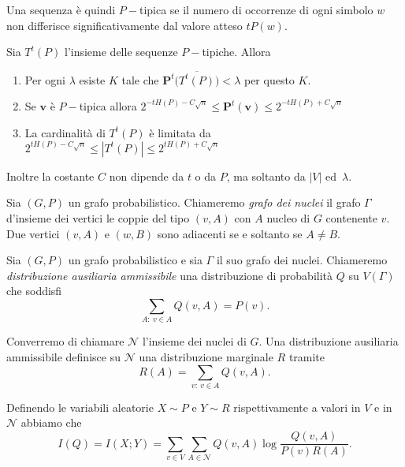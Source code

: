 Una sequenza è quindi \(P-\)tipica se il numero di occorrenze di ogni simbolo \(w\) non differisce significativamente dal valore atteso \(tP(w)\). 
\begin{lemma}
	\label{ptyplemma} Sia \(T^t(P)\) l'insieme delle sequenze \(P-\)tipiche. Allora 
	\begin{enumerate}
		\item Per ogni \(\lambda\) esiste \(K\) tale che \(\mathbf{P}^t\big(\overline{T^{t}(P)}\big)<\lambda\) per questo \(K\). 
		\item Se \(\mathbf{v}\) è \(P-\)tipica allora \(2^{-tH(P)-C\sqrt{n}}\le \mathbf{P}^t(\mathbf{v})\le2^{-tH(P)+C\sqrt{n}}\) 
		\item La cardinalità di \(T^{t}(P)\) è limitata da \(2^{tH(P)-C\sqrt{n}}\le |T^{t}(P)|\le 2^{tH(P)+C\sqrt{n}}\) 
	\end{enumerate}
	Inoltre la costante \(C\) non dipende da \(t\) o da \(P\), ma soltanto da \(|V|\) ed\ \(\lambda\). 
\end{lemma}
\begin{definition}
	Sia \((G,P)\) un grafo probabilistico. Chiameremo \emph{grafo dei nuclei} il grafo \(\Gamma\) d'insieme dei vertici le coppie del tipo \((v,A)\) con \(A\) nucleo di \(G\) contenente \(v\). Due vertici \((v,A)\) e \((w,B)\) sono adiacenti se e soltanto se \(A\neq B\). 
\end{definition}
\begin{definition}
	Sia \((G,P)\) un grafo probabilistico e sia \(\Gamma\) il suo grafo dei nuclei. Chiameremo \emph{distribuzione ausiliaria ammissibile} una distribuzione di probabilità \(Q\) su \(V(\Gamma)\) che soddisfi 
	\begin{equation}
		\label{eq:preimage} \sum_{A:\ v\in A} Q(v,A) = P(v). 
	\end{equation}
\end{definition}

Converremo di chiamare \(\mathcal{N}\) l'insieme dei nuclei di \(G\). Una distribuzione ausiliaria ammissibile definisce su \(\mathcal{N}\) una distribuzione marginale \(R\) tramite 
\begin{equation}
	\label{eq:margdist} R(A)=\sum_{v:\ v\in A} Q(v,A). 
\end{equation}

Definendo le variabili aleatorie \(X\sim P\) e \(Y\sim R\) rispettivamente a valori in \(V\) e in \(\mathcal{N}\) abbiamo che 
\begin{equation}
	\label{eq:continuous} I(Q)=I(X;Y)=\sum_{v\in V}\sum_{A\in \mathcal{N}} Q(v,A)\log{\frac{Q(v,A)}{P(v)R(A)}}. 
\end{equation}

